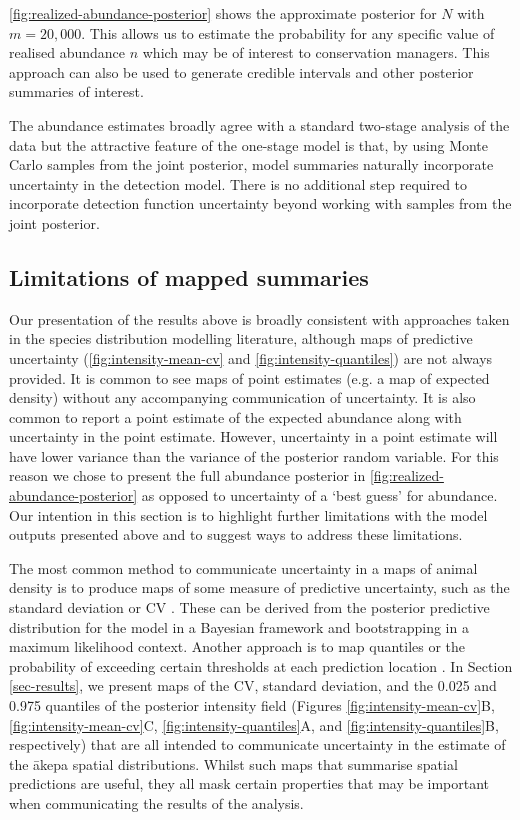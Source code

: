 \documentclass{stylefile16/statsoc}
\newcommand{\akepa}{\textquotesingle\={a}kepa}  %
\begin{document}
\autoref{fig:realized-abundance-posterior} shows the approximate posterior for $N$ with $m = 20,000$.  This allows us to estimate the probability for any specific value of realised abundance $n$ which may be of interest to conservation managers.  This approach can also be used to generate credible intervals and other posterior summaries of interest. 

The abundance estimates broadly agree with a standard two-stage analysis of the data \citep{camp_dsm_2020} but the attractive feature of the one-stage model is that, by using Monte Carlo samples from the joint posterior, model summaries naturally incorporate uncertainty in the detection model.  There is no additional step required to incorporate detection function uncertainty beyond working with samples from the joint posterior.

\vfill

\subsection{Limitations of mapped summaries}

Our presentation of the results above is broadly consistent with approaches taken in the species distribution modelling literature, although maps of predictive uncertainty (\autoref{fig:intensity-mean-cv} and \autoref{fig:intensity-quantiles}) are not always provided.  It is common to see maps of point estimates (e.g. a map of expected density) without any accompanying communication of uncertainty.  It is also common to report a point estimate of the expected abundance along with uncertainty in the point estimate.  However, uncertainty in a point estimate will have lower variance than the variance of the posterior random variable.  For this reason we chose to present the full abundance posterior in \autoref{fig:realized-abundance-posterior} as opposed to uncertainty of a `best guess' for abundance.  Our intention in this section is to highlight further limitations with the model outputs presented above and to suggest ways to address these limitations. 

The most common method to communicate uncertainty in a maps of animal density is to produce maps of some measure of predictive uncertainty, such as the standard deviation or CV \citep{fuller_novel_2018, vallejo_responses_2017,bradbury_mapping_2014}.  These can be derived from the posterior predictive distribution for the model in a Bayesian framework and bootstrapping in a maximum likelihood context.  Another approach is to map quantiles or the probability of exceeding certain thresholds at each prediction location \citep{russell_avoidance_2016, wilson_hierarchical_2010}.  In Section \ref{sec-results}, we present maps of the CV, standard deviation, and the 0.025 and 0.975 quantiles of the posterior intensity field (Figures \ref{fig:intensity-mean-cv}B, \ref{fig:intensity-mean-cv}C, \ref{fig:intensity-quantiles}A, and \ref{fig:intensity-quantiles}B, respectively) that are all intended to communicate uncertainty in the estimate of the \akepa{} spatial distributions.  Whilst such maps that summarise spatial predictions are useful, they all mask certain properties that may be important when communicating the results of the analysis. 
\end{document}
